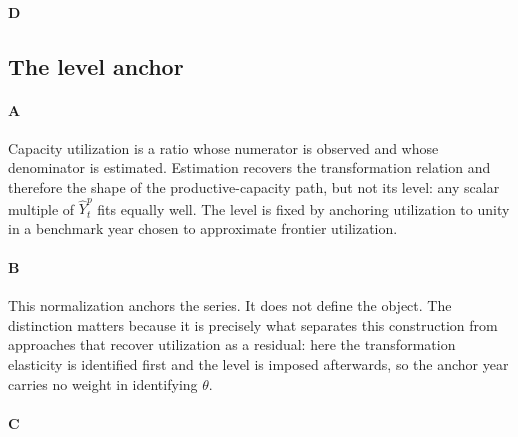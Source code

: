 \paragraph{D}

\subsection{The level anchor}

\paragraph{A}
Capacity utilization is a ratio whose numerator is observed and whose denominator is estimated. Estimation recovers the transformation relation and therefore the shape of the productive-capacity path, but not its level: any scalar multiple of $\hat{Y}^p_t$ fits equally well. The level is fixed by anchoring utilization to unity in a benchmark year chosen to approximate frontier utilization.

\paragraph{B}
This normalization anchors the series. It does not define the object. The distinction matters because it is precisely what separates this construction from approaches that recover utilization as a residual: here the transformation elasticity is identified first and the level is imposed afterwards, so the anchor year carries no weight in identifying $\theta$.

\paragraph{C}
